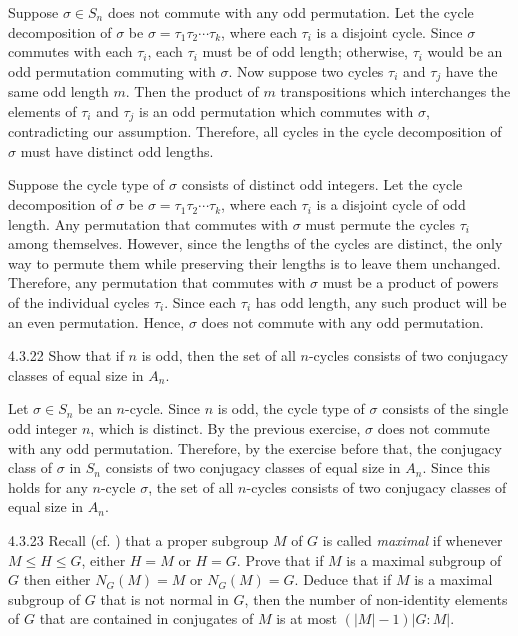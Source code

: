 \begin{soliff}[spsol]
	\rightimp Suppose $\sigma \in S_n$ does not commute with any odd permutation.
	Let the cycle decomposition of $\sigma$ be $\sigma = \tau_1\tau_2\cdots\tau_k$, where each $\tau_i$ is a disjoint cycle.
	Since $\sigma$ commutes with each $\tau_i$, each $\tau_i$ must be of odd length; otherwise, $\tau_i$ would be an odd permutation commuting with $\sigma$.
	Now suppose two cycles $\tau_i$ and $\tau_j$ have the same odd length $m$.
	Then the product of $m$ transpositions which interchanges the elements of $\tau_i$ and $\tau_j$ is an odd permutation which commutes with $\sigma$, contradicting our assumption.
	Therefore, all cycles in the cycle decomposition of $\sigma$ must have distinct odd lengths.

	\leftimp Suppose the cycle type of $\sigma$ consists of distinct odd integers.
	Let the cycle decomposition of $\sigma$ be $\sigma = \tau_1\tau_2\cdots\tau_k$, where each $\tau_i$ is a disjoint cycle of odd length.
	Any permutation that commutes with $\sigma$ must permute the cycles $\tau_i$ among themselves.
	However, since the lengths of the cycles are distinct, the only way to permute them while preserving their lengths is to leave them unchanged.
	Therefore, any permutation that commutes with $\sigma$ must be a product of powers of the individual cycles $\tau_i$.
	Since each $\tau_i$ has odd length, any such product will be an even permutation.
	Hence, $\sigma$ does not commute with any odd permutation.
\end{soliff}

\begin{exercise}{4.3.22}
	Show that if $n$ is odd, then the set of all $n$-cycles consists of two conjugacy classes of equal size in $A_n$.
\end{exercise}

\begin{sol}
	Let $\sigma \in S_n$ be an $n$-cycle.
	Since $n$ is odd, the cycle type of $\sigma$ consists of the single odd integer $n$, which is distinct.
	By the previous exercise, $\sigma$ does not commute with any odd permutation.
	Therefore, by the exercise before that, the conjugacy class of $\sigma$ in $S_n$ consists of two conjugacy classes of equal size in $A_n$.
	Since this holds for any $n$-cycle $\sigma$, the set of all $n$-cycles consists of two conjugacy classes of equal size in $A_n$.
\end{sol}

\begin{exercise}{4.3.23}
	Recall (cf. ) that a proper subgroup $M$ of $G$ is called \emph{maximal} if whenever $M \leq H \leq G$, either $H = M$ or $H = G$.
	Prove that if $M$ is a maximal subgroup of $G$ then either $N_G(M) = M$ or $N_G(M) = G$.
	Deduce that if $M$ is a maximal subgroup of $G$ that is not normal in $G$, then the number of non-identity elements of $G$ that are contained in conjugates of $M$ is at most $(|M| - 1)|G : M|$.
\end{exercise}

